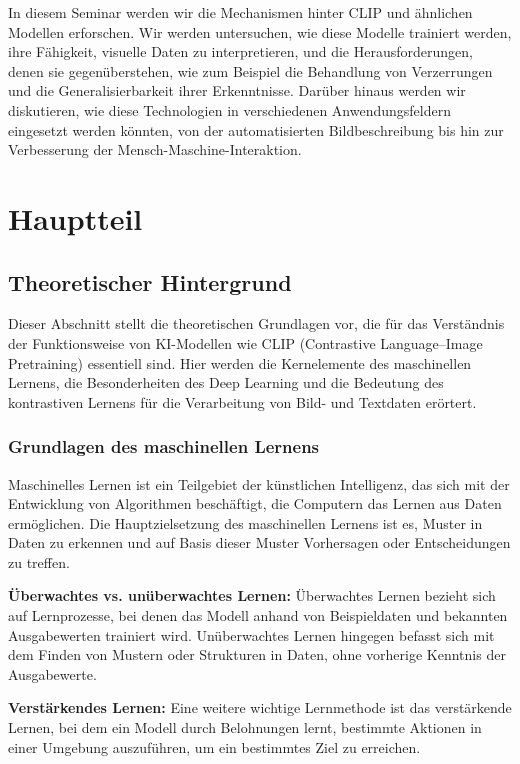\documentclass[nolibertine, ngerman]{ttlab-qualify}
\begin{document}
In diesem Seminar werden wir die Mechanismen hinter CLIP und ähnlichen Modellen erforschen. Wir werden untersuchen, wie diese Modelle 
trainiert werden, ihre Fähigkeit, visuelle Daten zu interpretieren, und die Herausforderungen, denen sie gegenüberstehen, wie zum Beispiel 
die Behandlung von Verzerrungen und die Generalisierbarkeit ihrer Erkenntnisse. Darüber hinaus werden wir diskutieren, wie diese Technologien 
in verschiedenen Anwendungsfeldern eingesetzt werden könnten, von der automatisierten Bildbeschreibung bis hin zur Verbesserung 
der Mensch-Maschine-Interaktion.

\chapter{Hauptteil}
\section{Theoretischer Hintergrund}
Dieser Abschnitt stellt die theoretischen Grundlagen vor, die für das Verständnis der Funktionsweise von KI-Modellen wie CLIP (Contrastive Language–Image Pretraining) essentiell sind. Hier werden die Kernelemente des maschinellen Lernens, die Besonderheiten des Deep Learning und die Bedeutung des kontrastiven Lernens für die Verarbeitung von Bild- und Textdaten erörtert.

\subsection{Grundlagen des maschinellen Lernens}

Maschinelles Lernen ist ein Teilgebiet der künstlichen Intelligenz, das sich mit der Entwicklung von Algorithmen beschäftigt, die Computern das Lernen aus Daten ermöglichen. Die Hauptzielsetzung des maschinellen Lernens ist es, Muster in Daten zu erkennen und auf Basis dieser Muster Vorhersagen oder Entscheidungen zu treffen.

\textbf{Überwachtes vs. unüberwachtes Lernen:} Überwachtes Lernen bezieht sich auf Lernprozesse, bei denen das Modell anhand von Beispieldaten und bekannten Ausgabewerten trainiert wird. Unüberwachtes Lernen hingegen befasst sich mit dem Finden von Mustern oder Strukturen in Daten, ohne vorherige Kenntnis der Ausgabewerte.

\textbf{Verstärkendes Lernen:} Eine weitere wichtige Lernmethode ist das verstärkende Lernen, bei dem ein Modell durch Belohnungen lernt, bestimmte Aktionen in einer Umgebung auszuführen, um ein bestimmtes Ziel zu erreichen.
\end{document}
